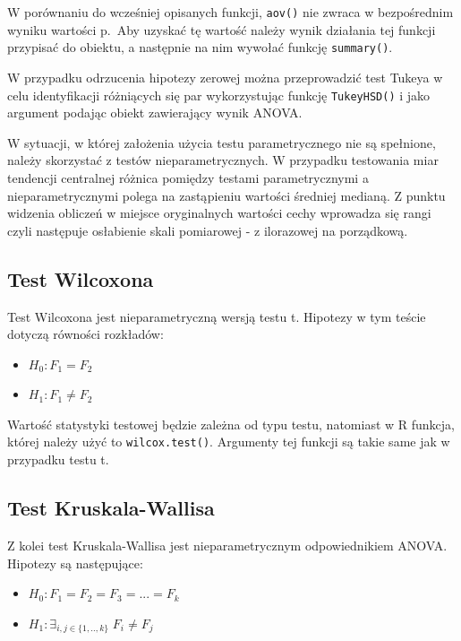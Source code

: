 \documentclass[
]{book}
\providecommand{\tightlist}{%
  \setlength{\itemsep}{0pt}\setlength{\parskip}{0pt}}
\begin{document}
W porównaniu do wcześniej opisanych funkcji, \texttt{aov()} nie zwraca w bezpośrednim wyniku wartości p.~Aby uzyskać tę wartość należy wynik działania tej funkcji przypisać do obiektu, a następnie na nim wywołać funkcję \texttt{summary()}.

W przypadku odrzucenia hipotezy zerowej można przeprowadzić test Tukeya w celu identyfikacji różniących się par wykorzystując funkcję \texttt{TukeyHSD()} i jako argument podając obiekt zawierający wynik ANOVA.

W sytuacji, w której założenia użycia testu parametrycznego nie są spełnione, należy skorzystać z testów nieparametrycznych. W przypadku testowania miar tendencji centralnej różnica pomiędzy testami parametrycznymi a nieparametrycznymi polega na zastąpieniu wartości średniej medianą. Z punktu widzenia obliczeń w miejsce oryginalnych wartości cechy wprowadza się rangi czyli następuje osłabienie skali pomiarowej - z ilorazowej na porządkową.

\hypertarget{test-wilcoxona}{%
\subsection{Test Wilcoxona}\label{test-wilcoxona}}

Test Wilcoxona jest nieparametryczną wersją testu t. Hipotezy w tym teście dotyczą równości rozkładów:

\begin{itemize}
\tightlist
\item
  \(H_0: F_1=F_2\)
\item
  \(H_1: F_1 \neq F_2\)
\end{itemize}

Wartość statystyki testowej będzie zależna od typu testu, natomiast w R funkcja, której należy użyć to \texttt{wilcox.test()}. Argumenty tej funkcji są takie same jak w przypadku testu t.

\hypertarget{test-kruskala-wallisa}{%
\subsection{Test Kruskala-Wallisa}\label{test-kruskala-wallisa}}

Z kolei test Kruskala-Wallisa jest nieparametrycznym odpowiednikiem ANOVA. Hipotezy są następujące:

\begin{itemize}
\tightlist
\item
  \(H_0: F_1=F_2=F_3=...=F_k\)
\item
  \(H_1: \exists_{i,j\in\{1,..,k\}} \; F_i \neq F_j\)
\end{itemize}
\end{document}
